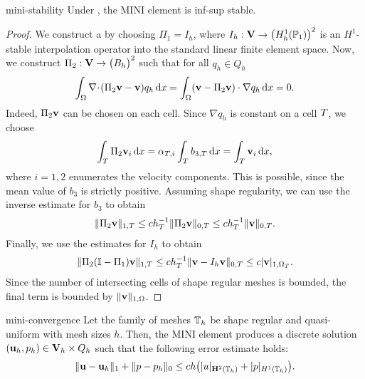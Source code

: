 \begin{Theorem}{mini-stability}
  Under ,
  the MINI element is inf-sup stable.
\end{Theorem}

\begin{proof}
  We construct a  by choosing
  $\Pi_1 = I_h$, where $I_h:\mathbf V\to \bigl(H^1_h(\mathbb P_1)\bigr)^2$ is an
  $H^1$-stable interpolation operator into the standard linear finite
  element space. Now, we construct $\Pi_2: \mathbf V \to \bigl(B_h\bigr)^2$
  such that for all $q_h\in Q_h$
  \begin{gather}
    \int_\Omega \nabla\!\cdot\!(\Pi_2 \mathbf v-\mathbf v) q_h \,\mathrm{d} x
    = \int_\Omega (\mathbf v-\Pi_2 \mathbf v)\cdot\nabla q_h\,\mathrm{d} x
    = 0.
  \end{gather}
  Indeed, $\Pi_2 \mathbf v$ can be chosen on each cell. Since $\nabla q_h$ is
  constant on a cell $T$, we choose
  \begin{gather}
    \int_T \Pi_2 \mathbf v_i \,\mathrm{d} x
    = \alpha_{T,i} \int_T b_{3,T}\,\mathrm{d} x
    = \int_T \mathbf v_i\,\mathrm{d} x,
  \end{gather}
  where $i=1,2$ enumerates the velocity components. This is possible,
  since the mean value of $b_3$ is strictly positive. Assuming shape
  regularity, we can use the inverse estimate for $b_3$ to obtain
  \begin{gather}
    \lVert\Pi_2 \mathbf v\rVert_{1,T}
    \le c h_T^{-1} \lVert\Pi_2 \mathbf v\rVert_{0,T}
    \le c h_T^{-1} \lVert\mathbf v\rVert_{0,T}.
  \end{gather}
  Finally, we use the estimates for $I_h$ to obtain
  \begin{gather}
    \lVert\Pi_2 (\mathbb I-\Pi_1) \mathbf v\rVert_{1,T}
    \le c h_T^{-1} \lVert\mathbf v-I_h \mathbf v\rVert_{0,T}
    \le c \lvert\mathbf v\rvert_{1,\Omega_T}.
  \end{gather}
  Since the number of intersecting cells of shape regular meshes is
  bounded, the final term is bounded by $\lVert\mathbf v\rVert_{1,\Omega}$.
\end{proof}

\begin{Theorem}{mini-convergence}
  Let the family of meshes $\mathbb T_h$ be shape regular and quasi-uniform with mesh
  sizes $h$. Then, the MINI element produces a discrete solution
  $(\mathbf u_h,p_h)\in \mathbf V_h\times Q_h$ such that the following error
  estimate holds:
  \begin{gather}
    \lVert\mathbf u - \mathbf u_h\rVert_1 + \lVert p-p_h\rVert_0
    \le c h \bigl(\lvert u\rvert_{\mathbf H^2(\mathbb T_h)} + \lvert p\rvert_{H^1(\mathbb T_h)}\bigr).
  \end{gather}
\end{Theorem}

